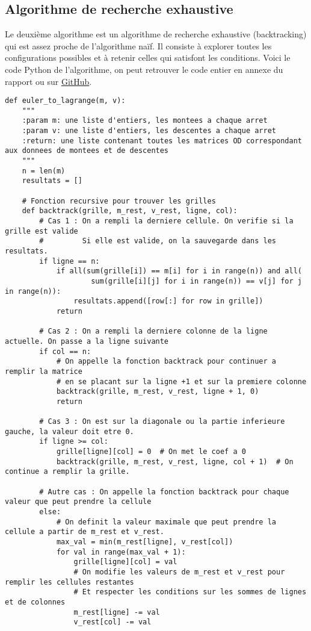 \documentclass[12pt]{article}
\begin{document}
\subsection{Algorithme de recherche exhaustive}
Le deuxième algorithme est un algorithme de recherche exhaustive (backtracking) qui est assez proche de l'algorithme naïf. Il consiste à explorer toutes les configurations possibles et à retenir celles qui satisfont les conditions. Voici le code Python de l'algorithme, on peut retrouver le code entier en annexe du rapport ou sur \href{https://github.com/GaryTheCaptn/graphes_stage}{GitHub}.
\begin{lstlisting}
def euler_to_lagrange(m, v):
    """
    :param m: une liste d'entiers, les montees a chaque arret
    :param v: une liste d'entiers, les descentes a chaque arret
    :return: une liste contenant toutes les matrices OD correspondant aux donnees de montees et de descentes
    """
    n = len(m)
    resultats = []

    # Fonction recursive pour trouver les grilles
    def backtrack(grille, m_rest, v_rest, ligne, col):
        # Cas 1 : On a rempli la derniere cellule. On verifie si la grille est valide
        #         Si elle est valide, on la sauvegarde dans les resultats.
        if ligne == n:
            if all(sum(grille[i]) == m[i] for i in range(n)) and all(
                    sum(grille[i][j] for i in range(n)) == v[j] for j in range(n)):
                resultats.append([row[:] for row in grille])
            return

        # Cas 2 : On a rempli la derniere colonne de la ligne actuelle. On passe a la ligne suivante
        if col == n:
            # On appelle la fonction backtrack pour continuer a remplir la matrice
            # en se placant sur la ligne +1 et sur la premiere colonne
            backtrack(grille, m_rest, v_rest, ligne + 1, 0)
            return

        # Cas 3 : On est sur la diagonale ou la partie inferieure gauche, la valeur doit etre 0.
        if ligne >= col:
            grille[ligne][col] = 0  # On met le coef a 0
            backtrack(grille, m_rest, v_rest, ligne, col + 1)  # On continue a remplir la grille.

        # Autre cas : On appelle la fonction backtrack pour chaque valeur que peut prendre la cellule
        else:
            # On definit la valeur maximale que peut prendre la cellule a partir de m_rest et v_rest.
            max_val = min(m_rest[ligne], v_rest[col])
            for val in range(max_val + 1):
                grille[ligne][col] = val
                # On modifie les valeurs de m_rest et v_rest pour remplir les cellules restantes
                # Et respecter les conditions sur les sommes de lignes et de colonnes
                m_rest[ligne] -= val
                v_rest[col] -= val


\end{lstlisting}
\end{document}
